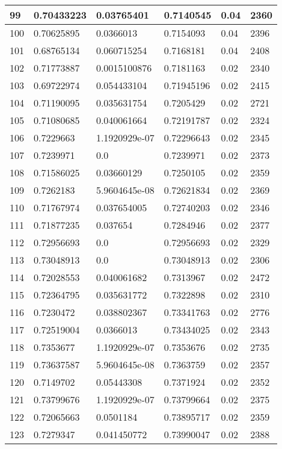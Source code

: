 \begin{longtable}{|l|l|l|l|l|l|}
99 & 0.70433223 & 0.03765401 & 0.7140545 & 0.04 & 2360 \\ \hline 
100 & 0.70625895 & 0.0366013 & 0.7154093 & 0.04 & 2396 \\ \hline 
101 & 0.68765134 & 0.060715254 & 0.7168181 & 0.04 & 2408 \\ \hline 
102 & 0.71773887 & 0.0015100876 & 0.7181163 & 0.02 & 2340 \\ \hline 
103 & 0.69722974 & 0.054433104 & 0.71945196 & 0.02 & 2415 \\ \hline 
104 & 0.71190095 & 0.035631754 & 0.7205429 & 0.02 & 2721 \\ \hline 
105 & 0.71080685 & 0.040061664 & 0.72191787 & 0.02 & 2324 \\ \hline 
106 & 0.7229663 & 1.1920929e-07 & 0.72296643 & 0.02 & 2345 \\ \hline 
107 & 0.7239971 & 0.0 & 0.7239971 & 0.02 & 2373 \\ \hline 
108 & 0.71586025 & 0.03660129 & 0.7250105 & 0.02 & 2359 \\ \hline 
109 & 0.7262183 & 5.9604645e-08 & 0.72621834 & 0.02 & 2369 \\ \hline 
110 & 0.71767974 & 0.037654005 & 0.72740203 & 0.02 & 2346 \\ \hline 
111 & 0.71877235 & 0.037654 & 0.7284946 & 0.02 & 2377 \\ \hline 
112 & 0.72956693 & 0.0 & 0.72956693 & 0.02 & 2329 \\ \hline 
113 & 0.73048913 & 0.0 & 0.73048913 & 0.02 & 2306 \\ \hline 
114 & 0.72028553 & 0.040061682 & 0.7313967 & 0.02 & 2472 \\ \hline 
115 & 0.72364795 & 0.035631772 & 0.7322898 & 0.02 & 2310 \\ \hline 
116 & 0.7230472 & 0.038802367 & 0.73341763 & 0.02 & 2776 \\ \hline 
117 & 0.72519004 & 0.0366013 & 0.73434025 & 0.02 & 2343 \\ \hline 
118 & 0.7353677 & 1.1920929e-07 & 0.7353676 & 0.02 & 2735 \\ \hline 
119 & 0.73637587 & 5.9604645e-08 & 0.7363759 & 0.02 & 2357 \\ \hline 
120 & 0.7149702 & 0.05443308 & 0.7371924 & 0.02 & 2352 \\ \hline 
121 & 0.73799676 & 1.1920929e-07 & 0.73799664 & 0.02 & 2375 \\ \hline 
122 & 0.72065663 & 0.0501184 & 0.73895717 & 0.02 & 2359 \\ \hline 
123 & 0.7279347 & 0.041450772 & 0.73990047 & 0.02 & 2388 \\ \hline 

\end{longtable}

